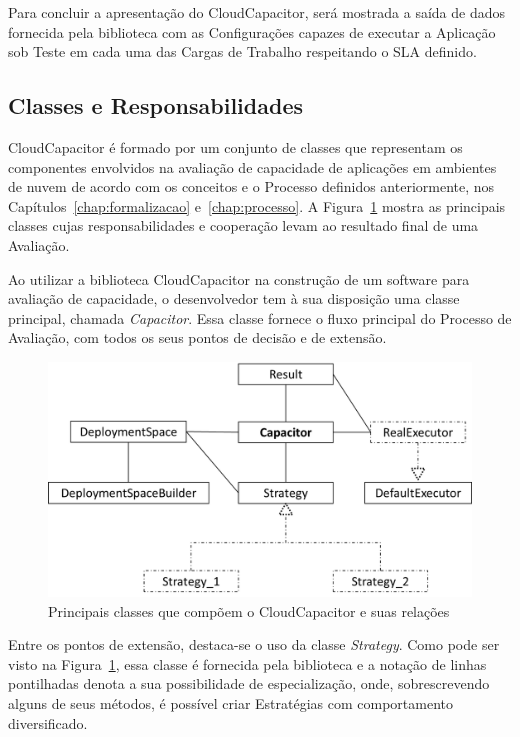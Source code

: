 Para concluir a apresentação do CloudCapacitor, será mostrada a saída de dados
fornecida pela biblioteca com as Configurações capazes de executar a
Aplicação sob Teste em cada uma das Cargas de Trabalho respeitando o SLA definido.

\subsection{Classes e Responsabilidades}
\label{subsec:classes}
CloudCapacitor é formado por um conjunto de classes que representam os
componentes envolvidos na avaliação de capacidade de aplicações em ambientes de
nuvem de acordo com os conceitos e o Processo definidos anteriormente, nos
Capítulos~\ref{chap:formalizacao} e~\ref{chap:processo}. A Figura~\ref{fig:classes}
mostra as principais classes cujas responsabilidades e cooperação levam ao 
resultado final de uma Avaliação. 

Ao utilizar a biblioteca CloudCapacitor na construção de um software para avaliação
de capacidade, o desenvolvedor tem à sua disposição uma classe principal, chamada
\emph{Capacitor}. Essa classe fornece o fluxo principal do Processo de
Avaliação, com todos os seus pontos de decisão e de extensão.

\begin{figure}[htb]
  \begin{center}
    \includegraphics[scale=0.75]{img/CapacitorClasses}
  \end{center}
  \caption{\label{fig:classes}Principais classes que compõem o CloudCapacitor e suas relações}
\end{figure}

Entre os pontos de extensão, destaca-se o uso da classe \emph{Strategy}. Como 
pode ser visto na Figura~\ref{fig:classes}, essa classe é fornecida pela biblioteca e a
notação de linhas pontilhadas denota a sua possibilidade de especialização, onde,
sobrescrevendo alguns de seus métodos, é possível criar Estratégias com comportamento
diversificado.

